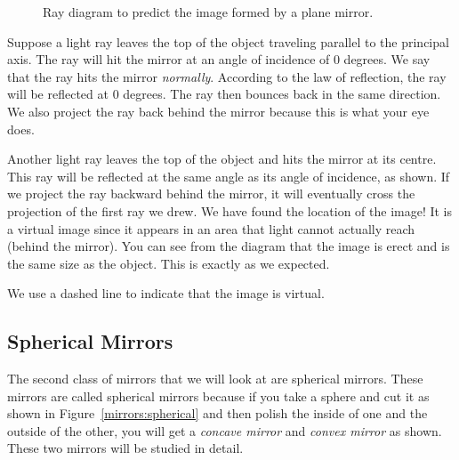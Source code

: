 \begin{figure}[htbp]
\centering
{}%
\caption{Ray diagram to predict the image formed by a plane mirror.}
\label{mirror:plane:ray}
\end{figure}

Suppose a light ray leaves the top of the object traveling parallel to the principal axis. The ray will hit the mirror at an angle of incidence of 0 degrees. We say that the ray hits the mirror \textit{normally}. According to the law of reflection, the ray will be reflected at 0 degrees. The ray then bounces back in the same direction. We also project the ray back behind the mirror because this is what your eye does.

Another light ray leaves the top of the object and hits the mirror at its centre. This ray will be reflected at the same angle as its angle of incidence, as shown. If we project the ray backward behind the mirror, it will eventually cross the projection of the first ray we drew. We have found the location of the image! It is a virtual image since it appears in an area that light cannot actually reach (behind the mirror). You can see from the diagram that the image is erect and is the same size as the object. This is exactly as we expected.

We use a dashed line to indicate that the image is virtual.

\subsection{Spherical Mirrors}
The second class of mirrors that we will look at are spherical mirrors. These mirrors are called spherical mirrors because if you take a sphere and cut it as shown in Figure~\ref{mirrors:spherical} and then polish the inside of one and the outside of the other, you will get a \textit{concave mirror} and \textit{convex mirror} as shown. These two mirrors will be studied in detail.

